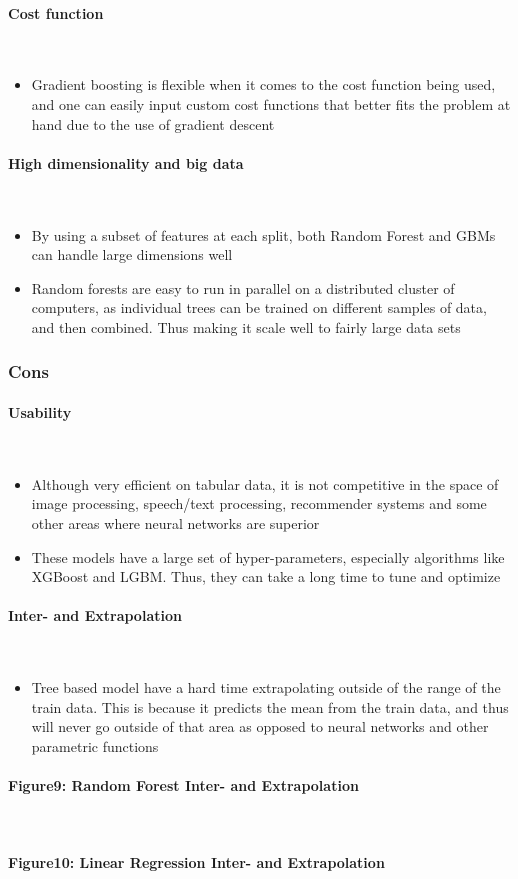 \documentclass[10pt, a4paper, twocolumn]{article}
\newcommand{\myparagraph}[1]{\paragraph{#1}\mbox{}\\}
\begin{document}
	\myparagraph{Cost function}
	\begin{itemize}
		\item Gradient boosting is flexible when it comes to the cost function being used, and one can easily input custom cost functions that better fits the problem at hand due to the use of gradient descent
	\end{itemize}
	\myparagraph{High dimensionality and big data}
	\begin{itemize}
		\item By using a subset of features at each split, both Random Forest and GBMs can handle large dimensions well
		\item Random forests are easy to run in parallel on a distributed cluster of computers, as individual trees can be trained on different samples of data, and then combined. Thus making it scale well to fairly large data sets
	\end{itemize}

	\subsubsection{Cons}
	\myparagraph{Usability}
	\begin{itemize}
		\item Although very efficient on tabular data, it is not competitive in the space of image processing, speech/text processing, recommender systems and some other areas where neural networks are superior
		\item These models have a large set of hyper-parameters, especially algorithms like XGBoost and LGBM. Thus, they can take a long time to tune and optimize
	\end{itemize}
	\myparagraph{Inter- and Extrapolation}
	\begin{itemize}
		\item Tree based model have a hard time extrapolating outside of the range of the train data. This is because it predicts the mean from the train data, and thus will never go outside of that area as opposed to neural networks and other parametric functions
	\end{itemize}
	\myparagraph{Figure9: Random Forest Inter- and Extrapolation}
	
	\myparagraph{Figure10: Linear Regression Inter- and Extrapolation}

	
\end{document}
